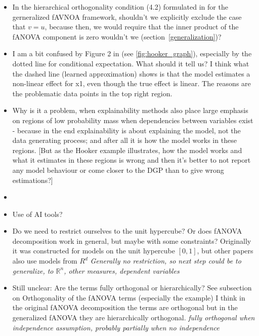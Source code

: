 \begin{itemize}
    \item In the hierarchical orthogonality condition (4.2) formulated in \cite{hooker2007} for the gerneralized fAVNOA framework, shouldn't we explicitly exclude the case that $v = u$, because then, we would require that the inner product of the fANOVA component is zero wouldn't we (section~\ref{generalization})?
    \item I am a bit confused by Figure 2 in \cite{hooker2007} (see \autoref{fig:hooker_graph}), especially by the dotted line for conditional expectation. What should it tell us? I think what the dashed line (learned approximation) shows is that the model estimates a non-linear effect for x1, even though the true effect is linear. The reasons are the problematic data points in the top right region.
    \item Why is it a problem, when explainability methods also place large emphasis on regions of low probability mass when dependencies between variables exist - because in the end explainability is about explaining the model, not the data generating process; and after all it is how the model works in these regions. [But as the Hooker example illustrates, how the model works and what it estimates in these regions is wrong and then it's better to not report any model behaviour or come closer to the DGP than to give wrong estimations?]
    \item 
    \item Use of AI tools?
    \item Do we need to restrict ourselves to the unit hypercube? Or does fANOVA decomposition work in general, but maybe with some constraints? Originally it was constructed for models on the unit hypercube $[0,1]$, but other papers also use models from $R^d$ \textit{Generally no restriction, so next step could be to generalize, to $\mathbb{R}^n$, other measures, dependent variables}
    \item Still unclear: Are the terms fully orthogonal or hierarchically? See subsection on Orthogonality of the fANOVA terms (especially the example) I think in the original fANOVA decomposition the terms are orthogonal but in the generalized fANOVA \citep{hooker2007} they are hierarchically orthogonal. \textit{fully orthogonal when independence assumption, probably partially when no independence}

\end{itemize}
